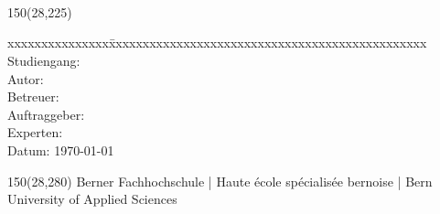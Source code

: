 \begin{titlepage}
\begin{flushleft}
\vspace*{115mm}

\fontsize{26pt}{28pt}\selectfont 
\titel	\\						%
\vspace{2mm}

\fontsize{16pt}{20pt}\selectfont\vspace{0.3em}
\untertitel 			\\				%
\vspace{5mm}

\fontsize{10pt}{12pt}\selectfont
\textbf{\ArtDerArbeit} \\		%
\vspace{3mm}


\begin{textblock}{150}(28,225)
\fontsize{10pt}{17pt}\selectfont
\begin{tabbing}
	xxxxxxxxxxxxxxx\=xxxxxxxxxxxxxxxxxxxxxxxxxxxxxxxxxxxxxxxxxxxxxxx \kill
	Studiengang:	\> \studiengang		\\
	Autor:		\> \autor		\\
	Betreuer:	\> \betreuer		\\
	Auftraggeber:	\> \auftraggeber	\\
	Experten:	\> \experte		\\
	Datum:		\> \today		\\
\end{tabbing}

\end{textblock}
\end{flushleft}

\begin{textblock}{150}(28,280)
\noindent 
\color{bfhgrey}\fontsize{9pt}{10pt}\selectfont
Berner Fachhochschule | Haute école spécialisée bernoise | Bern University of Applied Sciences
\color{black}\selectfont
\end{textblock}


\end{titlepage}